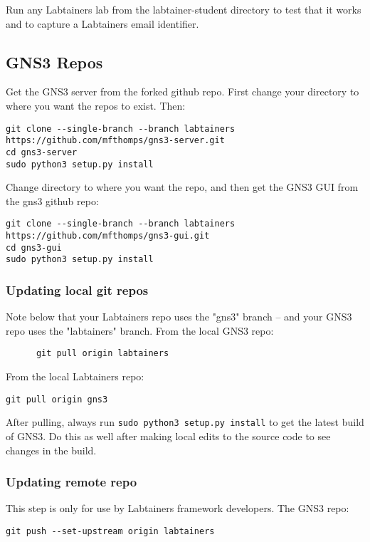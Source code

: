 \documentclass[12pt]{article}
\begin{document}
\vspace{5mm}

\noindent
Run any Labtainers lab from the labtainer-student directory to test that it works and to capture a Labtainers email identifier.

\subsection{GNS3 Repos}
Get the GNS3 server from the forked github repo.  First change your directory to where you want the repos to
exist.  Then:
\small
\begin{verbatim}
git clone --single-branch --branch labtainers https://github.com/mfthomps/gns3-server.git
cd gns3-server
sudo python3 setup.py install
\end{verbatim}

Change directory to where you want the repo, and then get the GNS3 GUI from the gns3 github repo:
\small
\begin{verbatim}
git clone --single-branch --branch labtainers  https://github.com/mfthomps/gns3-gui.git
cd gns3-gui
sudo python3 setup.py install
\end{verbatim}
\normalsize


\subsubsection{Updating local git repos}
Note below that your Labtainers repo uses the "gns3" branch -- and your GNS3 repo uses the "labtainers" branch.
From the local GNS3  repo:
\begin{verbatim}
      git pull origin labtainers
\end{verbatim}

From the local Labtainers repo:
\begin{verbatim}
git pull origin gns3
\end{verbatim}

After pulling, always run {\tt sudo python3 setup.py install} to get the latest 
build of GNS3. Do this as well after making local edits to the source code to see changes in the build.

\subsubsection{Updating remote repo}
This step is only for use by Labtainers framework developers.
The GNS3 repo:
\begin{verbatim}
git push --set-upstream origin labtainers
\end{verbatim}
\end{document}
